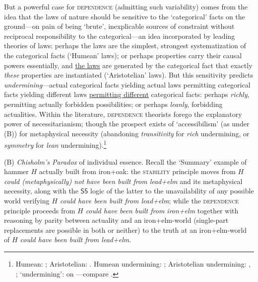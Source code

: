 \documentclass[12pt]{article}
\begin{document}
But a powerful case for \textsc{dependence} (admitting such variability) comes
from the idea that the laws of nature should be sensitive to the `categorical'
facts on the ground---on pain of being `brute', inexplicable sources of
constraint without reciprocal responsibility to the categorical---an idea
incorporated by leading theories of laws: perhaps the laws are the simplest,
strongest systematization of the categorical facts (`Humean' laws); or perhaps
properties carry their causal powers essentially, and \ul{the laws} are generated by the
categorical fact that exactly \emph{these} properties are instantiated
(`Aristotelian' laws). But this sensitivity predicts
\emph{undermining}---actual categorical facts yielding actual laws permitting
categorical facts yielding different laws \ul{permitting different} categorical
facts: perhaps \emph{richly}, permitting actually forbidden possibilities; or
perhaps \emph{leanly}, forbidding actualities. Within the literature,
\textsc{dependence} theorists forego the explanatory power of
necessitarianism; though the prospect exists of `accessibilism' (as under (B))
for metaphysical necessity (abandoning \emph{transitivity} for \emph{rich}
undermining, or \emph{symmetry} for \emph{lean} undermining).\footnote{Humean:
\citep[sec.~3.3]{lewis73}; Aristotelian: \citep{shoemaker80}. Humean
undermining: \citep[p.~20]{lewis86}; Aristotelian undermining:
\citep[sec.~3.1]{carroll94}, \citep[p.~244--5]{finevn}; `undermining':
\citep[p.~xv]{lewis86intro} on \citep{lewis80}---compare
\citep[p.~246n16]{finevn}.} 

(B) \emph{Chisholm's Paradox} of individual essence. Recall the `Summary'
example of hammer $H$ actually built from iron+oak: the \textsc{stability}
principle moves from \emph{$H$ could (metaphysically) not have been built from
lead+elm} and its metaphysical necessity, along with the $\mathsf{S5}$ logic
of the latter to the unavailability of any possible world verifying \emph{$H$
could have been built from lead+elm}; while the \textsc{dependence} principle
proceeds from \emph{$H$ could have been built from iron+elm} 
together with reasoning by parity between
actuality and an iron+elm-world (single-part replacements are possible in both
or neither) to the truth at an iron+elm-world of \emph{$H$ could have been
built from lead+elm}.
\end{document}
